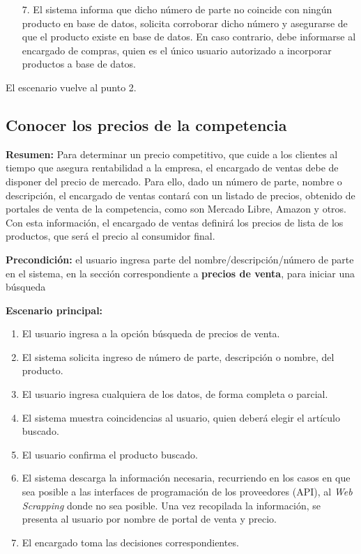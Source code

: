 \begin{enumerate}
	\item [7.] El sistema informa que dicho número de parte no coincide con ningún producto en base de datos, 
	solicita corroborar dicho número y asegurarse de que el producto existe en base de datos.
	En caso contrario, debe informarse al encargado de compras, quien es el único usuario autorizado a incorporar productos a base de datos.
\end{enumerate}

El escenario vuelve al punto 2.

\pagebreak

\subsection{Conocer los precios de la competencia}

\textbf{Resumen:}
Para determinar un precio competitivo,
que cuide a los clientes al tiempo que asegura rentabilidad a la empresa,
el encargado de ventas debe de disponer del precio de mercado.
Para ello, 
dado un número de parte,
nombre o descripción,
el encargado de ventas contará con un listado de precios,
obtenido de portales de venta de la competencia, 
como son Mercado Libre, Amazon y otros.
Con esta información, 
el encargado de ventas definirá los precios de lista de los productos,
que será el precio al consumidor final.

\textbf{Precondición:} 
el usuario ingresa parte del nombre/descripción/número de parte en el sistema,
en la sección correspondiente a \textbf{precios de venta},
para iniciar una búsqueda

\textbf{Escenario principal:}
\begin{enumerate}
	\item El usuario ingresa a la opción búsqueda de precios de venta.
	\item El sistema solicita ingreso de número de parte, descripción o nombre, del producto.
	\item El usuario ingresa cualquiera de los datos, de forma completa o parcial.
	\item El sistema muestra coincidencias al usuario, quien deberá elegir el artículo buscado.
	\item El usuario confirma el producto buscado.
	\item El sistema descarga la información necesaria, 
	recurriendo en los casos en que sea posible a las interfaces de programación de los proveedores (API),
	al \textit{Web Scrapping} donde no sea posible. Una vez recopilada la información, 
	se presenta al usuario por nombre de portal de venta y precio.
	\item El encargado toma las decisiones correspondientes.
\end{enumerate}

